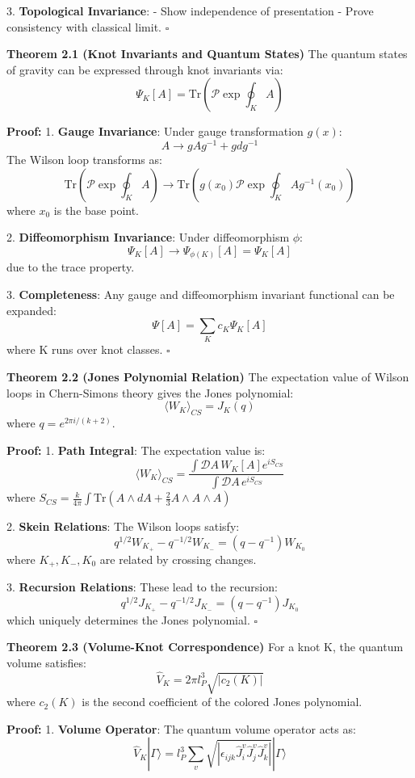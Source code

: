 \documentclass[12pt,a4paper]{article}
\begin{document}
3. \textbf{Topological Invariance}:
   - Show independence of presentation
   - Prove consistency with classical limit. $\square$

\textbf{Theorem 2.1 (Knot Invariants and Quantum States)}
The quantum states of gravity can be expressed through knot invariants via:
\[
\Psi_K[A] = \text{Tr}(\mathcal{P}\exp\oint_K A)
\]

\textbf{Proof:}
1. \textbf{Gauge Invariance}:
   Under gauge transformation $g(x)$:
   \[
   A \rightarrow gAg^{-1} + gdg^{-1}
   \]
   The Wilson loop transforms as:
   \[
   \text{Tr}(\mathcal{P}\exp\oint_K A) \rightarrow \text{Tr}(g(x_0)\mathcal{P}\exp\oint_K A g^{-1}(x_0))
   \]
   where $x_0$ is the base point.

2. \textbf{Diffeomorphism Invariance}:
   Under diffeomorphism $\phi$:
   \[
   \Psi_K[A] \rightarrow \Psi_{\phi(K)}[A] = \Psi_K[A]
   \]
   due to the trace property.

3. \textbf{Completeness}:
   Any gauge and diffeomorphism invariant functional can be expanded:
   \[
   \Psi[A] = \sum_K c_K \Psi_K[A]
   \]
   where K runs over knot classes. $\square$

\textbf{Theorem 2.2 (Jones Polynomial Relation)}
The expectation value of Wilson loops in Chern-Simons theory gives the Jones polynomial:
\[
\langle W_K \rangle_{CS} = J_K(q)
\]
where $q = e^{2\pi i/(k+2)}$.

\textbf{Proof:}
1. \textbf{Path Integral}:
   The expectation value is:
   \[
   \langle W_K \rangle_{CS} = \frac{\int \mathcal{D}A\, W_K[A] e^{iS_{CS}}}{\int \mathcal{D}A\, e^{iS_{CS}}}
   \]
   where $S_{CS} = \frac{k}{4\pi}\int \text{Tr}(A\wedge dA + \frac{2}{3}A\wedge A\wedge A)$

2. \textbf{Skein Relations}:
   The Wilson loops satisfy:
   \[
   q^{1/2}W_{K_+} - q^{-1/2}W_{K_-} = (q-q^{-1})W_{K_0}
   \]
   where $K_+, K_-, K_0$ are related by crossing changes.

3. \textbf{Recursion Relations}:
   These lead to the recursion:
   \[
   q^{1/2}J_{K_+} - q^{-1/2}J_{K_-} = (q-q^{-1})J_{K_0}
   \]
   which uniquely determines the Jones polynomial. $\square$

\textbf{Theorem 2.3 (Volume-Knot Correspondence)}
For a knot K, the quantum volume satisfies:
\[
\hat{V}_K = 2\pi l_P^3 \sqrt{|c_2(K)|}
\]
where $c_2(K)$ is the second coefficient of the colored Jones polynomial.

\textbf{Proof:}
1. \textbf{Volume Operator}:
   The quantum volume operator acts as:
   \[
   \hat{V}_K|\Gamma\rangle = l_P^3\sum_v \sqrt{|\epsilon_{ijk}\hat{J}_i^v\hat{J}_j^v\hat{J}_k^v|}|\Gamma\rangle
   \]
\end{document}
